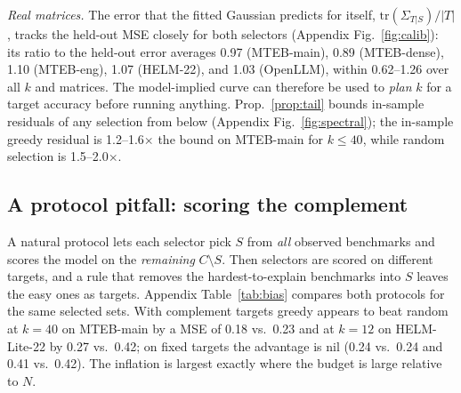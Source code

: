 \emph{Real matrices.} The error that the fitted Gaussian predicts for itself, $\mathrm{tr}(\Sigma_{T|S})/|T|$, tracks the held-out MSE closely for both selectors (Appendix Fig.~\ref{fig:calib}): its ratio to the held-out error averages 0.97 (MTEB-main), 0.89 (MTEB-dense), 1.10 (MTEB-eng), 1.07 (HELM-22), and 1.03 (OpenLLM), within 0.62--1.26 over all $k$ and matrices. The model-implied curve can therefore be used to \emph{plan} $k$ for a target accuracy before running anything. Prop.~\ref{prop:tail} bounds in-sample residuals of any selection from below (Appendix Fig.~\ref{fig:spectral}); the in-sample greedy residual is 1.2--1.6$\times$ the bound on MTEB-main for $k\le40$, while random selection is 1.5--2.0$\times$.


\subsection{A protocol pitfall: scoring the complement}
\label{sec:exp_pitfall}
A natural protocol lets each selector pick $S$ from \emph{all} observed benchmarks and scores the model on the \emph{remaining} $C\setminus S$. Then selectors are scored on different targets, and a rule that removes the hardest-to-explain benchmarks into $S$ leaves the easy ones as targets. Appendix Table~\ref{tab:bias} compares both protocols for the same selected sets. With complement targets greedy appears to beat random at $k=40$ on MTEB-main by a MSE of 0.18 vs.\ 0.23 and at $k=12$ on HELM-Lite-22 by 0.27 vs.\ 0.42; on fixed targets the advantage is nil (0.24 vs.\ 0.24 and 0.41 vs.\ 0.42). The inflation is largest exactly where the budget is large relative to $N$.

